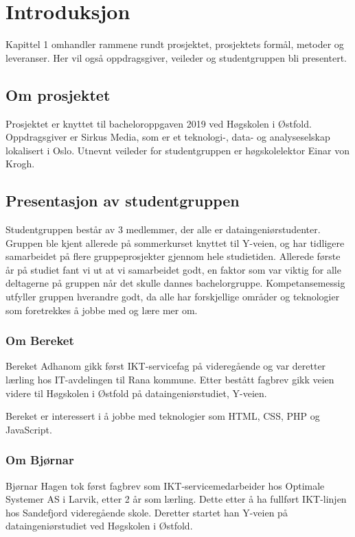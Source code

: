 \cleardoublepage
\chapter{Introduksjon}
\label{chap:intro}
Kapittel 1 omhandler rammene rundt prosjektet, prosjektets formål, metoder og leveranser. Her vil også oppdragsgiver, veileder og studentgruppen bli presentert. 

\section{Om prosjektet}
Prosjektet er knyttet til bacheloroppgaven 2019 ved Høgskolen i Østfold. Oppdragsgiver er Sirkus Media, som er et teknologi-, data- og analyseselskap lokalisert i Oslo. Utnevnt veileder for studentgruppen er høgskolelektor Einar von Krogh.

\section{Presentasjon av studentgruppen}

Studentgruppen består av 3 medlemmer, der alle er dataingeniørstudenter. Gruppen ble kjent allerede på sommerkurset knyttet til Y-veien, og har tidligere samarbeidet på flere gruppeprosjekter gjennom hele studietiden. Allerede første år på studiet fant vi ut at vi samarbeidet godt, en faktor som var viktig for alle deltagerne på gruppen når det skulle dannes bachelorgruppe. Kompetansemessig utfyller gruppen hverandre godt, da alle har forskjellige områder og teknologier som foretrekkes å jobbe med og lære mer om.  

\subsection{Om Bereket}
Bereket Adhanom gikk først IKT-servicefag på videregående og var deretter lærling hos IT-avdelingen til Rana kommune. Etter bestått fagbrev gikk veien videre til Høgskolen i Østfold på dataingeniørstudiet, Y-veien.

Bereket er interessert i å jobbe med teknologier som HTML, CSS, PHP og JavaScript.

\subsection{Om Bjørnar}
Bjørnar Hagen tok først fagbrev som IKT-servicemedarbeider hos Optimale Systemer AS i Larvik, etter 2 år som lærling. Dette etter å ha fullført IKT-linjen hos Sandefjord videregående skole. Deretter startet han Y-veien på dataingeniørstudiet ved Høgskolen i Østfold.

